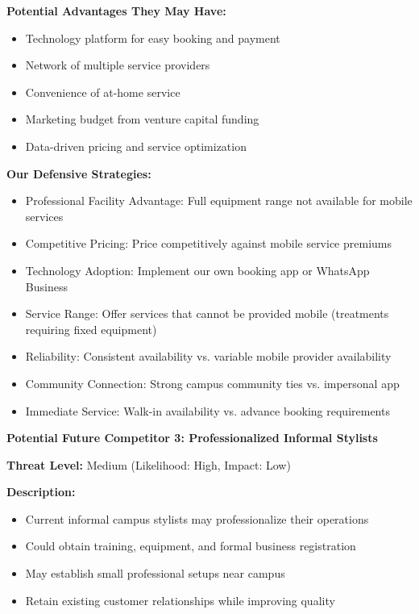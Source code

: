 \textbf{Potential Advantages They May Have:}
\begin{itemize}[leftmargin=2em]
    \item Technology platform for easy booking and payment
    \item Network of multiple service providers
    \item Convenience of at-home service
    \item Marketing budget from venture capital funding
    \item Data-driven pricing and service optimization
\end{itemize}

\textbf{Our Defensive Strategies:}
\begin{itemize}[leftmargin=2em]
    \item Professional Facility Advantage: Full equipment range not available for mobile services
    \item Competitive Pricing: Price competitively against mobile service premiums
    \item Technology Adoption: Implement our own booking app or WhatsApp Business
    \item Service Range: Offer services that cannot be provided mobile (treatments requiring fixed equipment)
    \item Reliability: Consistent availability vs. variable mobile provider availability
    \item Community Connection: Strong campus community ties vs. impersonal app
    \item Immediate Service: Walk-in availability vs. advance booking requirements
\end{itemize}

\vspace{1em}

\textbf{Potential Future Competitor 3: Professionalized Informal Stylists}

\textbf{Threat Level:} Medium (Likelihood: High, Impact: Low)

\textbf{Description:}
\begin{itemize}[leftmargin=2em]
    \item Current informal campus stylists may professionalize their operations
    \item Could obtain training, equipment, and formal business registration
    \item May establish small professional setups near campus
    \item Retain existing customer relationships while improving quality
\end{itemize}

